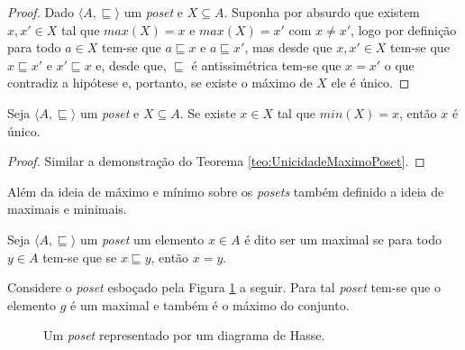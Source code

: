 \begin{proof}
	Dado $\langle A, \sqsubseteq \rangle$ um \textit{poset} e $X \subseteq A$. Suponha por absurdo que existem $x, x' \in X$ tal que $max(X) = x$ e $max(X) = x'$ com $x \neq x'$, logo por definição para todo $a \in X$ tem-se que $a \sqsubseteq x$ e $a \sqsubseteq x'$, mas desde que $x, x '\in X$ tem-se que $x \sqsubseteq x'$ e $x' \sqsubseteq x$ e, desde que, $\sqsubseteq$ é antissimétrica tem-se que $x = x'$ o que contradiz a hipótese e, portanto, se existe o máximo de $X$ ele é único.
\end{proof}

\begin{theorem}\label{teo:UnicidadeMinimoPoset}
	Seja $\langle A, \sqsubseteq \rangle$ um \textit{poset} e $X \subseteq A$. Se existe $x \in X$ tal que $min(X) = x$, então $x$ é único.
\end{theorem}

\begin{proof}
	Similar a demonstração do Teorema \ref{teo:UnicidadeMaximoPoset}.
\end{proof}

Além da ideia de máximo e mínimo sobre os \textit{posets} também definido a ideia de maximais e minimais.

\begin{definition}\label{def:MaximaisPoset}
	Seja $\langle A, \sqsubseteq \rangle$ um \textit{poset}  um elemento $x \in A$ é dito ser um maximal se para todo $y \in A$ tem-se que se $x \sqsubseteq y$, então $x = y$.
\end{definition}

\begin{example}
	Considere o \textit{poset} esboçado pela Figura \ref{fig:DiagramaHasse7} a seguir. Para tal \textit{poset} tem-se que o elemento $g$ é um maximal e também é o máximo do conjunto.
	
	\begin{figure}[h]
		\centering
		\caption{Um \textit{poset} representado por um diagrama de Hasse.}
		\label{fig:DiagramaHasse7}
	\end{figure}
\end{example}

